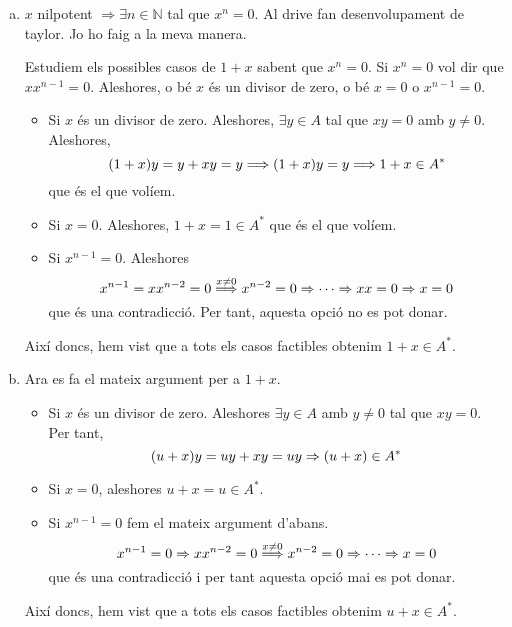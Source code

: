 \documentclass[../main.tex]{subfiles}
\begin{document}
\begin{sol}
\begin{enumerate}[(a)]
    \item $x$ nilpotent $\Rightarrow \exists n\in\mathbb{N}$ tal que $x^n = 0$. Al drive fan desenvolupament de taylor. Jo ho faig a la meva manera.
    
    Estudiem els possibles casos de $1+x$ sabent que $x^n = 0$. Si $x^n = 0$ vol dir que $xx^{n-1} = 0$. Aleshores, o bé $x$ és un divisor de zero, o bé $x = 0$ o $x^{n-1} = 0$. 
    \begin{itemize}
        \item  Si $x$ és un divisor de zero. Aleshores, $\exists y\in A$ tal que $xy = 0$ amb $y\not=0$. Aleshores, 
        \begin{equation}
            \notag
            (1+x)y = y+xy = y \Longrightarrow (1+x)y = y \Longrightarrow 1+x\in A^*
        \end{equation}
        que és el que volíem.
        \item Si $x = 0$. Aleshores, $1+x = 1\in A^*$ que és el que volíem.
        \item Si $x^{n-1} = 0$. Aleshores
        \begin{equation}
            \notag
            x^{n-1} = xx^{n-2} = 0 \overset{x\not=0}{\Longrightarrow} x^{n-2} = 0 \Rightarrow \cdots \Rightarrow xx = 0\Rightarrow x= 0
        \end{equation}
        que és una contradicció. Per tant, aquesta opció no es pot donar.
    \end{itemize}
    Així doncs, hem vist que a tots els casos factibles obtenim $1+x\in A^*$.
    
    
    \item Ara es fa el mateix argument per a $1+x$. 
    \begin{itemize}
        \item Si $x$ és un divisor de zero. Aleshores $\exists y\in A$ amb $y\not=0$ tal que $xy = 0$. Per tant,
        \begin{equation}
            \notag
            (u+x)y = uy+xy = uy \Rightarrow (u+x)\in A^*
        \end{equation}
        \item Si $x = 0$, aleshores $u+x = u\in A^*$.
        \item Si $x^{n-1} = 0$ fem el mateix argument d'abans. 
        \begin{equation}
            \notag
            x^{n-1} = 0\Rightarrow xx^{n-2} = 0\overset{x\not=0}{\Longrightarrow} x^{n-2}= 0 \Rightarrow \cdots \Rightarrow x= 0
        \end{equation}
        que és una contradicció i per tant aquesta opció mai es pot donar.
    \end{itemize}
    Així doncs, hem vist que a tots els casos factibles obtenim $u+x\in A^*$.
    

\end{enumerate}
\end{sol}
\end{document}
